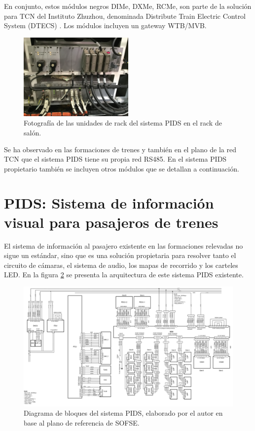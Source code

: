 En conjunto, estos módulos negros DIMe, DXMe, RCMe, son parte de la solución para TCN del Instituto Zhuzhou, denominada Distribute Train Electric Control System (DTECS)  \cite{feng2016survey}. Los módulos incluyen un gateway WTB/MVB.\\

\begin{figure}[h!]
	\centering
	\includegraphics[width=0.5\textwidth]{./Figures/rackPIDS1.JPG}
	\caption{Fotografía de las unidades de rack del sistema PIDS en el rack de salón.}
	\label{fig:rackPIDS1}
\end{figure}

Se ha observado en las formaciones de trenes y también en el plano de la red TCN que el sistema PIDS tiene su propia red RS485. En el sistema PIDS propietario también se incluyen otros módulos que se detallan a continuación.


\section{PIDS: Sistema de información visual para pasajeros de trenes}

El sistema de información al pasajero existente en las formaciones relevadas no sigue un estándar, sino que es una solución propietaria para resolver tanto el circuito de cámaras, el sistema de audio, los mapas de recorrido y los carteles LED. En la figura \ref{fig:diagramaPIDS} se presenta la arquitectura de este sistema PIDS existente.\\

\begin{figure}[h!]
	\centering
	\includegraphics[width=1.5\textwidth, angle=90]{./Figures/diagramaPIDS.png}
	\caption{Diagrama de bloques del sistema PIDS, elaborado por el autor en base al plano de referencia de SOFSE.}
	\label{fig:diagramaPIDS}
\end{figure}

